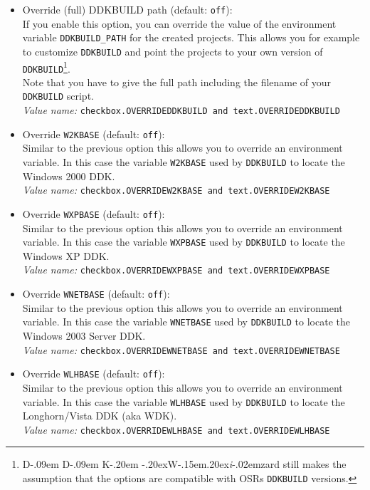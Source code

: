 \documentclass[a4paper,titlepage]{report}
\newcommand{\default}[1]{\textcolor[gray]{0.40}{(default: \texttt{#1})}}
\newcommand{\option}[1]{\textcolor[rgb]{0.00,0.20,0.20}{\textsf{#1}}}
\newcommand{\optiondeco}[1]{#1\vspace{0.1cm}}
\newcommand{\inioption}[1]{\\\textcolor[rgb]{0.00,0.00,0.40}{\textsl{Value name:} \texttt{#1}}}
\def\ddkwiz{D\kern-.09em D\kern-.09em K\kern-.20em \raise-.20ex\hbox{W}\kern-.15em\raise.20ex\hbox{\it{i}}\kern-.02em{zard}}
\begin{document}
\begin{itemize}
  created. This allows you to manipulate the behavior of the project by
  modifying some default options. Also environment variables can be declared.
  By default the variable \texttt{DDKBUILD\_PATH} is declared.
  \inioption{checkbox.PROPERTYSHEET}
  \item \optiondeco{\option{Override (full) DDKBUILD path} \default{off}:}\\
  If you enable this option, you can override the value of the environment variable
  \texttt{DDKBUILD\_PATH} for the created projects. This allows you for example
  to customize \texttt{DDKBUILD} and point the projects to your own version of
  \texttt{DDKBUILD}\footnote{\ddkwiz{} still makes the assumption that the
  options are compatible with OSRs \texttt{DDKBUILD} versions.}.\\
  Note that you have to give the full path including the filename of your
  \texttt{DDKBUILD} script.
  \inioption{checkbox.OVERRIDEDDKBUILD \textrm{and} text.OVERRIDEDDKBUILD}
  \item \optiondeco{\option{Override \texttt{W2KBASE}} \default{off}:}\\
  Similar to the previous option this allows you to override an environment
  variable.
  In this case the variable \texttt{W2KBASE} used by \texttt{DDKBUILD} to
  locate the Windows 2000 DDK.
  \inioption{checkbox.OVERRIDEW2KBASE \textrm{and} text.OVERRIDEW2KBASE}
  \item \optiondeco{\option{Override \texttt{WXPBASE}} \default{off}:}\\
  Similar to the previous option this allows you to override an environment
  variable.
  In this case the variable \texttt{WXPBASE} used by \texttt{DDKBUILD} to
  locate the Windows XP DDK.
  \inioption{checkbox.OVERRIDEWXPBASE \textrm{and} text.OVERRIDEWXPBASE}
  \item \optiondeco{\option{Override \texttt{WNETBASE}} \default{off}:}\\
  Similar to the previous option this allows you to override an environment
  variable.
  In this case the variable \texttt{WNETBASE} used by \texttt{DDKBUILD} to
  locate the Windows 2003 Server DDK.
  \inioption{checkbox.OVERRIDEWNETBASE \textrm{and} text.OVERRIDEWNETBASE}
  \item \optiondeco{\option{Override \texttt{WLHBASE}} \default{off}:}\\
  Similar to the previous option this allows you to override an environment
  variable.
  In this case the variable \texttt{WLHBASE} used by \texttt{DDKBUILD} to
  locate the Longhorn/Vista DDK (aka WDK).
  \inioption{checkbox.OVERRIDEWLHBASE \textrm{and} text.OVERRIDEWLHBASE}
\end{itemize}
\end{document}
